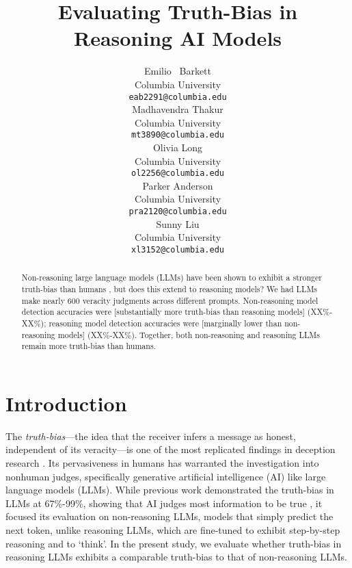\documentclass{article}
\title{Evaluating Truth-Bias in Reasoning AI Models}
\author{%
  Emilio ~Barkett\\
  Columbia University\\
  \texttt{eab2291@columbia.edu} \\
   \And
   Madhavendra Thakur \\
   Columbia University \\
   \texttt{mt3890@columbia.edu} \\
   \AND
   Olivia Long \\
   Columbia University \\
   \texttt{ol2256@columbia.edu} \\
   \And
   Parker Anderson \\
   Columbia University \\
   \texttt{pra2120@columbia.edu} \\
   \And
   Sunny Liu \\
   Columbia University \\
   \texttt{xl3152@columbia.edu} \\
}
\begin{document}
\maketitle


\begin{abstract}
  Non-reasoning large language models (LLMs) have been shown to exhibit a stronger truth-bias than humans \citep{markowitz_generative_2024}, but does this extend to reasoning models? We had LLMs make nearly 600 veracity judgments across different prompts. Non-reasoning model detection accuracies were [substantially more truth-bias than reasoning models] (XX\%-XX\%); reasoning model detection accuracies were [marginally lower than non-reasoning models] (XX\%-XX\%). Together, both non-reasoning and reasoning LLMs remain more truth-bias than humans.
\end{abstract}

\section{Introduction}


The \textit{truth-bias}---the idea that the receiver infers a message as honest, independent of its veracity---is one of the most replicated findings in deception research \citep{levine_duped_2020, levine_truth-default_2014}. Its pervasiveness in humans has warranted the investigation into nonhuman judges, specifically generative artificial intelligence (AI) like large language models (LLMs). While previous work demonstrated the truth-bias in LLMs at 67\%-99\%, showing that AI judges most information to be true \citep{markowitz_generative_2024}, it focused its evaluation on non-reasoning LLMs, models that simply predict the next token, unlike reasoning LLMs, which are fine-tuned to exhibit step-by-step reasoning and to `think'. In the present study, we evaluate whether truth-bias in reasoning LLMs exhibits a comparable truth-bias to that of non-reasoning LLMs.
\end{document}
